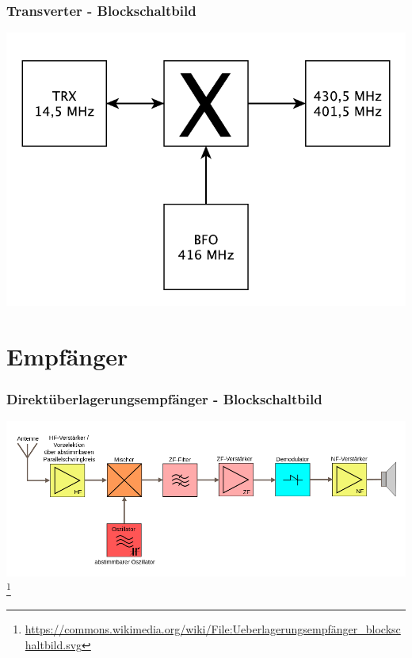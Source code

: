 \begin{frame}
    \frametitle{Transverter - Blockschaltbild}
    \begin{center}
        \includegraphics[width=1\textwidth]{e15/transverter.pdf}
	\end{center}
\end{frame}

\section*{Empfänger}

\begin{frame}
    \frametitle{Direktüberlagerungsempfänger - Blockschaltbild}
    \begin{center}
        \includegraphics[width=.99\textwidth]{e15/Ueberlagerungsempfanger_blockschaltbild.png}
        \footnote{\tiny \url{https://commons.wikimedia.org/wiki/File:Ueberlagerungsempfänger_blockschaltbild.svg}}
	\end{center}
\end{frame}

